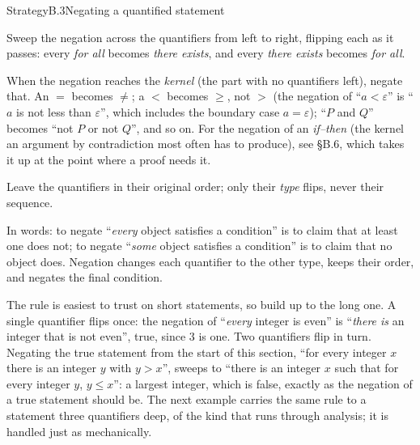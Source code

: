 \documentclass[a4paper,12pt,oneside]{memoir}
\begin{document}
\begin{envstrategy}{Strategy}{B.3}{Negating a quantified statement}
\begin{steps}
  \item Sweep the negation across the quantifiers from left to right, flipping each as it passes: every \emph{for all} becomes \emph{there exists}, and every \emph{there exists} becomes \emph{for all}.
  \item When the negation reaches the \emph{kernel} (the part with no quantifiers left), negate that. An \(=\) becomes \(\neq\); a \(<\) becomes \(\ge\), not \(>\) (the negation of “\(a < \varepsilon\)” is “\(a\) is not less than \(\varepsilon\)”, which includes the boundary case \(a = \varepsilon\)); “\(P\) and \(Q\)” becomes “not \(P\) or not \(Q\)”, and so on. For the negation of an \emph{if–then} (the kernel an argument by contradiction most often has to produce), see §B.6, which takes it up at the point where a proof needs it.
  \item Leave the quantifiers in their original order; only their \emph{type} flips, never their sequence.
\end{steps}
\begin{informal}
In words: to negate “\emph{every} object satisfies a condition” is to claim that at least one does not; to negate “\emph{some} object satisfies a condition” is to claim that no object does. Negation changes each quantifier to the other type, keeps their order, and negates the final condition.
\end{informal}
\end{envstrategy}
The rule is easiest to trust on short statements, so build up to the long one. A single quantifier flips once: the negation of “\emph{every} integer is even” is “\emph{there is} an integer that is not even”, true, since \(3\) is one. Two quantifiers flip in turn. Negating the true statement from the start of this section, “for every integer \(x\) there is an integer \(y\) with \(y > x\)”, sweeps to “there is an integer \(x\) such that for every integer \(y\), \(y \le x\)”: a largest integer, which is false, exactly as the negation of a true statement should be. The next example carries the same rule to a statement three quantifiers deep, of the kind that runs through analysis; it is handled just as mechanically.
\end{document}
